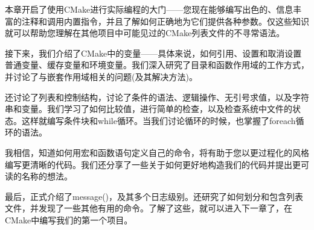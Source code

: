 本章开启了使用CMake进行实际编程的大门——您现在能够编写出色的、信息丰富的注释和调用内置指令，并且了解如何正确地为它们提供各种参数。仅这些知识就可以帮助您理解在其他项目中可能见过的CMake列表文件的不寻常语法。

接下来，我们介绍了CMake中的变量——具体来说，如何引用、设置和取消设置普通变量、缓存变量和环境变量。我们深入研究了目录和函数作用域的工作方式，并讨论了与嵌套作用域相关的问题(及其解决方法)。

还讨论了列表和控制结构，讨论了条件的语法、逻辑操作、无引号求值，以及字符串和变量。我们学习了如何比较值，进行简单的检查，以及检查系统中文件的状态。这样就编写条件块和while循环。当我们讨论循环的时候，也掌握了foreach循环的语法。

我相信，知道如何用宏和函数语句定义自己的命令，将有助于您以更过程化的风格编写更清晰的代码。我们还分享了一些关于如何更好地构造我们的代码并提出更可读的名称的想法。

最后，正式介绍了message()，及其多个日志级别。还研究了如何划分和包含列表文件，并发现了一些其他有用的命令。了解了这些，就可以进入下一章了，在CMake中编写我们的第一个项目。